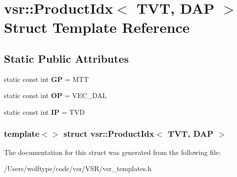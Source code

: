 \hypertarget{structvsr_1_1_product_idx_3_01_t_v_t_00_01_d_a_p_01_4}{\section{vsr\-:\-:Product\-Idx$<$ T\-V\-T, D\-A\-P $>$ Struct Template Reference}
\label{structvsr_1_1_product_idx_3_01_t_v_t_00_01_d_a_p_01_4}
}
\subsection*{Static Public Attributes}
\begin{DoxyCompactItemize}
\item 
\hypertarget{structvsr_1_1_product_idx_3_01_t_v_t_00_01_d_a_p_01_4_a7f973db0d515edc06a66123291fb22bc}{static const int {\bfseries G\-P} = M\-T\-T}\label{structvsr_1_1_product_idx_3_01_t_v_t_00_01_d_a_p_01_4_a7f973db0d515edc06a66123291fb22bc}

\item 
\hypertarget{structvsr_1_1_product_idx_3_01_t_v_t_00_01_d_a_p_01_4_a155c74140a2d3017b95c620a3a6235dc}{static const int {\bfseries O\-P} = V\-E\-C\-\_\-\-D\-A\-L}\label{structvsr_1_1_product_idx_3_01_t_v_t_00_01_d_a_p_01_4_a155c74140a2d3017b95c620a3a6235dc}

\item 
\hypertarget{structvsr_1_1_product_idx_3_01_t_v_t_00_01_d_a_p_01_4_ae88134bcc6a237c6d9bd14bd99c1d83f}{static const int {\bfseries I\-P} = T\-V\-D}\label{structvsr_1_1_product_idx_3_01_t_v_t_00_01_d_a_p_01_4_ae88134bcc6a237c6d9bd14bd99c1d83f}

\end{DoxyCompactItemize}
\subsubsection*{template$<$$>$ struct vsr\-::\-Product\-Idx$<$ T\-V\-T, D\-A\-P $>$}



The documentation for this struct was generated from the following file\-:\begin{DoxyCompactItemize}
\item 
/\-Users/wolftype/code/vsr/\-V\-S\-R/vsr\-\_\-templates.\-h\end{DoxyCompactItemize}
